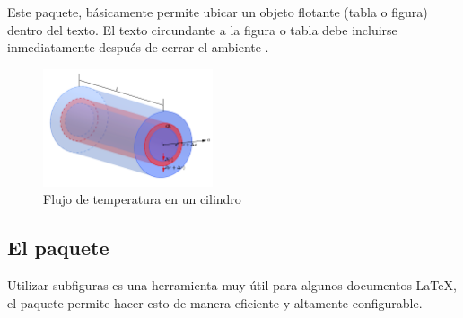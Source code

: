 \documentclass{article}
\begin{document}
Este paquete, básicamente permite ubicar un objeto flotante (tabla o figura) dentro del texto. El texto circundante a la figura o tabla debe incluirse inmediatamente después de cerrar el ambiente .

\begin{figure}
	\centering
    \caption{Flujo de temperatura en un cilindro}
    \includegraphics[width = 5cm]{cilindro}
\end{figure}
\textcolor{gray!95}{\lipsum[1-2]}

\subsection{El paquete }

Utilizar subfiguras es una herramienta muy útil para algunos documentos \LaTeX{}, el paquete  permite hacer esto de manera eficiente y altamente configurable.
\end{document}
